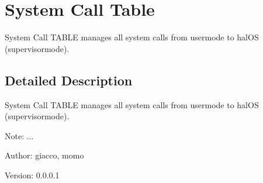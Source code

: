 \hypertarget{group___s_y_s_t_e_m___c_a_l_l___t_a_b_l_e}{
\section{System Call Table}
\label{group___s_y_s_t_e_m___c_a_l_l___t_a_b_l_e}
}
System Call TABLE manages all system calls from usermode to halOS (supervisormode).  




\subsection{Detailed Description}
System Call TABLE manages all system calls from usermode to halOS (supervisormode). 

\begin{Desc}
\item[Note:]... \end{Desc}
\begin{Desc}
\item[Author:]giacco, momo \end{Desc}
\begin{Desc}
\item[Version:]0.0.0.1 \end{Desc}
